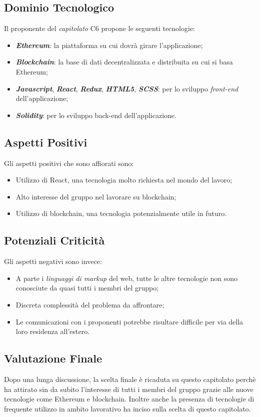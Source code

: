 \subsection{Dominio Tecnologico}
Il proponente del \textit{capitolato} C6 propone le seguenti tecnologie:
\begin{itemize}
	\item \textit{\textbf{Ethereum}}: la piattaforma su cui dovrà girare l'applicazione;
	\item \textit{\textbf{Blockchain}}: la base di dati decentralizzata e distribuita su cui si basa Ethereum;
	\item \textbf{\textit{Javascript}}, \textit{\textbf{React}}, \textit{\textbf{Redux}}, \textbf{\textit{HTML5}}, \textit{\textbf{SCSS}}: 
	per lo sviluppo \textit{front-end} dell'applicazione;
	\item \textit{\textbf{Solidity}}: per lo sviluppo back-end dell'applicazione.
\end{itemize}

\subsection{Aspetti Positivi}
Gli aspetti positivi che sono affiorati sono:
\begin{itemize}
	\item Utilizzo di React, una tecnologia molto richiesta nel mondo del lavoro;
	\item Alto interesse del gruppo nel lavorare su blockchain;
	\item Utilizzo di blockchain, una tecnologia potenzialmente utile in futuro.
\end{itemize}

\subsection{Potenziali Criticità}
Gli aspetti negativi sono invece:
\begin{itemize}
	\item A parte i \textit{linguaggi di markup} del web, tutte le altre tecnologie non sono conosciute da quasi tutti i membri del gruppo;
	\item Discreta complessità del problema da affrontare;
	\item Le comunicazioni con i proponenti potrebbe risultare difficile per via della loro residenza all'estero.
\end{itemize}

\subsection{Valutazione Finale}
Dopo una lunga discussione, la scelta finale è ricaduta su questo capitolato perchè ha attirato sin da subito l'interesse di tutti i membri del gruppo grazie alle nuove tecnologie come Ethereum e blockchain.
Inoltre anche la presenza di tecnologie di frequente utilizzo in ambito lavorativo ha inciso sulla scelta di questo capitolato.